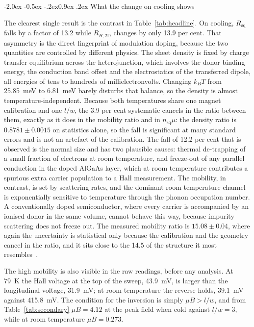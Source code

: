 \documentclass[11pt,a4paper]{article}
\makeatletter
\renewcommand\subsection{\@startsection{subsection}{2}{\z@}%
  {-2.0ex \@plus -0.5ex \@minus -.2ex}{0.9ex \@plus .2ex}%
  {\normalfont\normalsize\bfseries}}
\newcommand{\Rsq}{R_{\mathrm{sq}}}
\newcommand{\Rhtwod}{R_{H,\mathrm{2D}}}
\newcommand{\nsq}{n_{\mathrm{sq}}}
\makeatother
\begin{document}
\subsection{What the change on cooling shows}

The clearest single result is the contrast in Table~\ref{tab:headline}. On cooling, $\Rsq$
falls by a factor of \num{13.2} while $\Rhtwod$ changes by only \num{13.9} per cent. That
asymmetry is the direct fingerprint of modulation doping, because the two quantities are
controlled by different physics. The sheet density is fixed by charge transfer equilibrium
across the heterojunction, which involves the donor binding energy, the conduction band offset
and the electrostatics of the transferred dipole, all energies of tens to hundreds of
millielectronvolts. Changing $k_BT$ from \qty{25.85}{\milli\electronvolt} to
\qty{6.81}{\milli\electronvolt} barely disturbs that balance, so the density is almost
temperature-independent. Because both temperatures share one magnet calibration and one
$l/w$, the \num{3.9} per cent systematic cancels in the ratio between them, exactly as it does
in the mobility ratio and in $\nsq\mu$: the density ratio is $0.8781 \pm 0.0015$ on statistics
alone, so the fall is significant at many standard errors and is not an artefact of the
calibration. The fall of \num{12.2} per cent that is observed is the normal size
and has two plausible causes: thermal de-trapping of a small fraction of electrons at room
temperature, and freeze-out of any parallel conduction in the doped AlGaAs layer, which at
room temperature contributes a spurious extra carrier population to a Hall measurement. The
mobility, in contrast, is set by scattering rates, and the dominant room-temperature channel
is exponentially sensitive to temperature through the phonon occupation number. A
conventionally doped semiconductor, where every carrier is accompanied by an ionised donor in
the same volume, cannot behave this way, because impurity scattering does not freeze out. The
measured mobility ratio is $15.08 \pm 0.04$, where again the uncertainty is statistical only
because the calibration and the geometry cancel in the ratio, and it sits close to the
\num{14.5} of the structure it most resembles~\cite{seliuta2007}.

The high mobility is also visible in the raw readings, before any analysis. At
\qty{79}{\kelvin} the Hall voltage at the top of the sweep, \qty{43.9}{\milli\volt}, is larger
than the longitudinal voltage, \qty{31.9}{\milli\volt}; at room temperature the reverse holds,
\qty{39.1}{\milli\volt} against \qty{415.8}{\milli\volt}. The condition for the inversion is
simply $\mu B > l/w$, and from Table~\ref{tab:secondary} $\mu B = 4.12$ at the peak field when
cold against $l/w = 3$, while at room temperature $\mu B = 0.273$.
\end{document}
